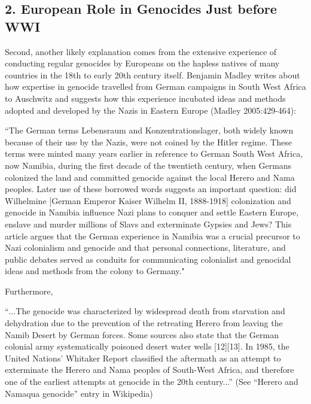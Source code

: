 \subsection*{2. European Role in Genocides Just before WWI}

Second, another likely explanation comes from the extensive experience of conducting regular genocides by Europeans on the hapless natives of many countries in the 18th to early 20th century itself. Benjamin Madley writes about how expertise in genocide travelled from German campaigns in South West Africa to Auschwitz and suggests how this experience incubated ideas and methods adopted and developed by the Nazis in Eastern Europe (Madley 2005:429-464):

\begin{myquote}
``The German terms Lebensraum and Konzentrationslager, both widely known because of their use by the Nazis, were not coined by the Hitler regime. These terms were minted many years earlier in reference to German South West Africa, now Namibia, during the first decade of the twentieth century, when Germans colonized the land and committed genocide against the local Herero and Nama peoples. Later use of these borrowed words suggests an important question: did Wilhelmine [German Emperor Kaiser Wilhelm II, 1888-1918] colonization and genocide in Namibia  influence Nazi plans to conquer and settle Eastern Europe, enslave and murder millions of Slavs and exterminate Gypsies and Jews? This article argues that the German experience in Namibia was a crucial precursor to Nazi colonialism and genocide and that personal connections, literature, and public debates served as conduits for communicating colonialist and genocidal ideas and methods from the colony to Germany."
\end{myquote}

Furthermore, 
\begin{myquote}
“$\ldots$The genocide was characterized by widespread death from starvation and dehydration due to the prevention of the retreating Herero from leaving the Namib Desert by German forces. Some sources also state that the German colonial army systematically poisoned desert water wells [12][13]. In 1985, the United Nations' Whitaker Report classified the aftermath as an attempt to exterminate the Herero and Nama peoples of South-West Africa, and therefore one of the earliest attempts at genocide in the 20th century...” \hfill(See “Herero and Namaqua genocide” entry in Wikipedia)
\end{myquote}


